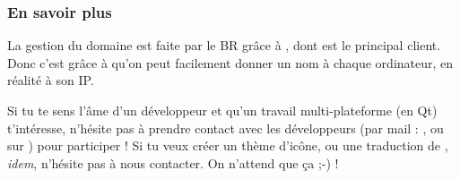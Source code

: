 \subsubsection{En savoir plus}

La gestion du domaine  est faite par le BR grâce à ,
dont  est le principal client. Donc c'est grâce à  qu'on peut facilement
donner un nom à chaque ordinateur, en réalité à son IP.

Si tu te sens l'âme d'un développeur et qu'un travail multi-plateforme (en Qt) t'intéresse, n'hésite pas à prendre contact avec les développeurs (par
mail : , ou sur ) pour participer ! Si tu veux créer un thème d'icône, ou une traduction de
, \emph{idem}, n'hésite pas à nous contacter. On n'attend que ça ;-) !
